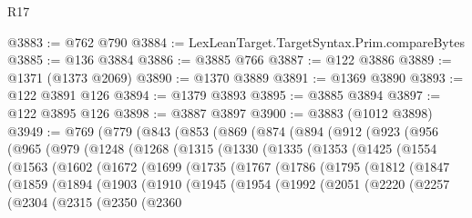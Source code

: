 \begin{lexlean}{R17}
\begin{coremodule}
{{{{{{{{{{{{{{{{{{{{{{{{{{{{{{{{{{{{{{{{{{{{{{{{{{{{{{{{{{{{{{{{{{{{{{{{{{{{{{{{{{{{{{{{{{{{{{{{{{{{{{{{{{{@3883 := @762 @790
@3884 := LexLeanTarget.TargetSyntax.Prim.compareBytes
@3885 := @136 @3884
@3886 := @3885 @766
@3887 := @122 @3886
@3889 := @1371 (@1373 @2069)
@3890 := @1370 @3889
@3891 := @1369 @3890
@3893 := @122 @3891 @126
@3894 := @1379 @3893
@3895 := @3885 @3894
@3897 := @122 @3895 @126
@3898 := @3887 @3897
@3900 := @3883 (@1012 @3898)
@3949 := @769
    (@779
      (@843
        (@853
          (@869
            (@874
              (@894
                (@912
                  (@923
                    (@956
                      (@965
                        (@979
                          (@1248
                            (@1268
                              (@1315
                                (@1330
                                  (@1335
                                    (@1353
                                      (@1425
                                        (@1554
                                          (@1563
                                            (@1602
                                              (@1672
                                                (@1699
                                                  (@1735
                                                    (@1767
                                                      (@1786
                                                        (@1795
                                                          (@1812
                                                            (@1847
                                                              (@1859
                                                                (@1894
                                                                  (@1903
                                                                    (@1910
                                                                      (@1945
                                                                        (@1954
                                                                          (@1992
                                                                            (@2051
                                                                              (@2220
                                                                                (@2257
                                                                                  (@2304
                                                                                    (@2315
                                                                                      (@2350
                                                                                        (@2360
}}}}}}}}}}}}}}}}}}}}}}}}}}}}}}}}}}}}}}}}}}}}}}}}}}}}}}}}}}}}}}}}}}}}}}}}}}}}}}}}}}}}}}}}}}}}}}}}}}}}}}}}}}}
\end{coremodule}
\end{lexlean}

